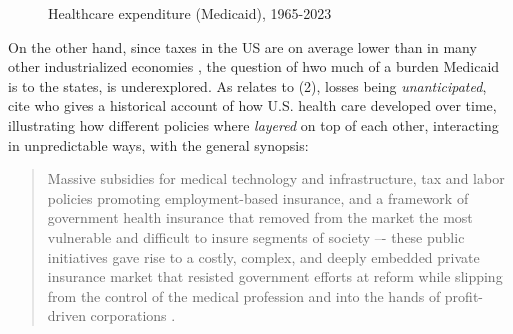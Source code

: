 \documentclass[11pt]{article}
\begin{document}
\begin{figure}[!ht]
  \sffamily
  \caption{Healthcare expenditure (Medicaid), 1965-2023}
  
  \label{fig:expend_states}
\end{figure}

On the other hand, since taxes in the US are on average lower than in many other industrialized economies \parencite[see e.g.][]{Jarass2017}, the question of hwo much of a burden Medicaid is to the states, is underexplored. As relates to (2), losses being \textit{unanticipated}, \textcite[][]{Jacobs2014} cite \textcite[][]{Hacker1998} who gives a historical account of how U.S. health care developed over time, illustrating how different policies where \textit{layered} on top of each other, interacting in unpredictable ways, with the general synopsis:

\begin{quote}
  Massive subsidies for medical technology and infrastructure, tax and labor policies promoting employment-based insurance, and a framework of government health insurance that removed from the market the most vulnerable and difficult to insure segments of society –- these public initiatives gave rise to a costly, complex, and deeply embedded private insurance market that resisted government efforts at reform while slipping from the control of the medical profession and into the hands of profit-driven corporations \parencite[][p. 107]{Hacker1998}.
\end{quote}
\end{document}
